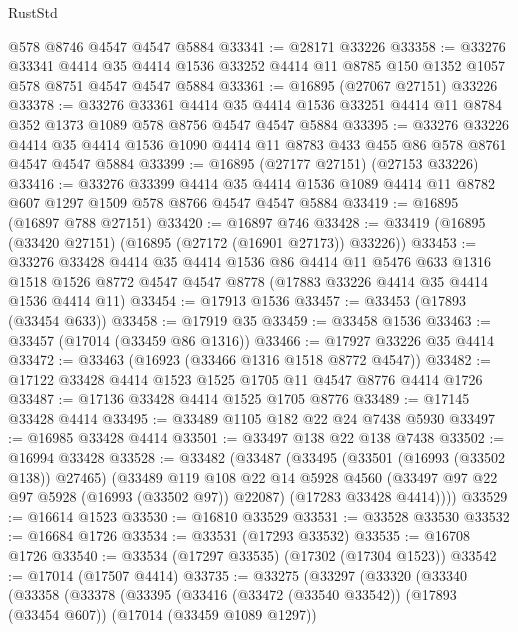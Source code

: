 \begin{lexlean}{RustStd}
\begin{coremodule}
    @578
    @8746
    @4547
    @4547
    @5884
@33341 := @28171 @33226
@33358 := @33276
    @33341
    @4414
    @35
    @4414
    @1536
    @33252
    @4414
    @11
    @8785
    @150
    @1352
    @1057
    @578
    @8751
    @4547
    @4547
    @5884
@33361 := @16895 (@27067 @27151) @33226
@33378 := @33276
    @33361
    @4414
    @35
    @4414
    @1536
    @33251
    @4414
    @11
    @8784
    @352
    @1373
    @1089
    @578
    @8756
    @4547
    @4547
    @5884
@33395 := @33276
    @33226
    @4414
    @35
    @4414
    @1536
    @1090
    @4414
    @11
    @8783
    @433
    @455
    @86
    @578
    @8761
    @4547
    @4547
    @5884
@33399 := @16895 (@27177 @27151) (@27153 @33226)
@33416 := @33276
    @33399
    @4414
    @35
    @4414
    @1536
    @1089
    @4414
    @11
    @8782
    @607
    @1297
    @1509
    @578
    @8766
    @4547
    @4547
    @5884
@33419 := @16895 (@16897 @788 @27151)
@33420 := @16897 @746
@33428 := @33419 (@16895 (@33420 @27151) (@16895 (@27172 (@16901 @27173)) @33226))
@33453 := @33276
    @33428
    @4414
    @35
    @4414
    @1536
    @86
    @4414
    @11
    @5476
    @633
    @1316
    @1518
    @1526
    @8772
    @4547
    @4547
    @8778
    (@17883 @33226 @4414 @35 @4414 @1536 @4414 @11)
@33454 := @17913 @1536
@33457 := @33453 (@17893 (@33454 @633))
@33458 := @17919 @35
@33459 := @33458 @1536
@33463 := @33457 (@17014 (@33459 @86 @1316))
@33466 := @17927 @33226 @35 @4414
@33472 := @33463 (@16923 (@33466 @1316 @1518 @8772 @4547))
@33482 := @17122 @33428 @4414 @1523 @1525 @1705 @11 @4547 @8776 @4414 @1726
@33487 := @17136 @33428 @4414 @1525 @1705 @8776
@33489 := @17145 @33428 @4414
@33495 := @33489 @1105 @182 @22 @24 @7438 @5930
@33497 := @16985 @33428 @4414
@33501 := @33497 @138 @22 @138 @7438
@33502 := @16994 @33428
@33528 := @33482
    (@33487
      (@33495
        (@33501 (@16993 (@33502 @138)) @27465)
        (@33489
          @119
          @108
          @22
          @14
          @5928
          @4560
          (@33497 @97 @22 @97 @5928 (@16993 (@33502 @97)) @22087)
          (@17283 @33428 @4414))))
@33529 := @16614 @1523
@33530 := @16810 @33529
@33531 := @33528 @33530
@33532 := @16684 @1726
@33534 := @33531 (@17293 @33532)
@33535 := @16708 @1726
@33540 := @33534 (@17297 @33535) (@17302 (@17304 @1523))
@33542 := @17014 (@17507 @4414)
@33735 := @33275
    (@33297
      (@33320
        (@33340
          (@33358
            (@33378
              (@33395
                (@33416
                  (@33472 (@33540 @33542))
                  (@17893 (@33454 @607))
                  (@17014 (@33459 @1089 @1297))

\end{coremodule}
\end{lexlean}
